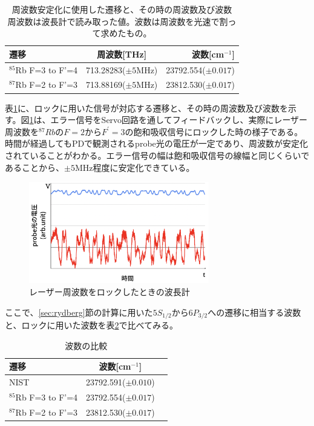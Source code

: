 \documentclass[dvipdfmx]{jsreport}
\begin{document}
\begin{table}[hbtp]
  \caption{周波数安定化に使用した遷移と、その時の周波数及び波数　周波数は波長計で読み取った値。波数は周波数を光速で割って求めたもの。}
  \label{table:lock}
  \centering
  \begin{tabular}{lcr}
    \hline
    遷移 & 周波数[THz] & 波数[cm$^{-1}$]  \\
    \hline
    $^{85}$Rb F=3 to F'=4  & 713.28283($\pm5$MHz) & 23792.554($\pm0.017$)  \\
    $^{87}$Rb F=2 to F'=3  & 713.88169($\pm5$MHz) & 23812.530($\pm0.017$)  \\
    \hline
  \end{tabular}
\end{table}
表\ref{table:lock}に、ロックに用いた信号が対応する遷移と、その時の周波数及び波数を示す。図\ref{fig:mt-lock}は、エラー信号をServo回路を通してフィードバックし、実際にレーザー周波数を$^{87}Rb$の$F=2$から$F^{'}=3$の飽和吸収信号にロックした時の様子である。時間が経過してもPDで観測されるprobe光の電圧が一定であり、周波数が安定化されていることがわかる。エラー信号の幅は飽和吸収信号の線幅と同じくらいであることから、$\pm 5$MHz程度に安定化できている。

\begin{figure}
\centering
\includegraphics[width=0.7\textwidth]{images/mt_lock.png}
\caption{\label{fig:mt-lock}レーザー周波数をロックしたときの波長計}
\end{figure}

ここで、\ref{sec:rydberg}節の計算に用いた$5S_{1/2}$から$6P_{3/2}$への遷移に相当する波数と、ロックに用いた波数を表\ref{table:k}で比べてみる。
\begin{table}[hbtp]
  \caption{波数の比較}
  \label{table:k}
  \centering
  \begin{tabular}{lcr}
    \hline
    遷移 & 波数[cm$^{-1}$]  \\
    \hline
    NIST\cite{nist} & 23792.591($\pm0.010$) \\
    $^{85}$Rb F=3 to F'=4  & 23792.554($\pm0.017$)  \\
    $^{87}$Rb F=2 to F'=3  & 23812.530($\pm0.017$)  \\
    \hline
  \end{tabular}
\end{table}
\end{document}
